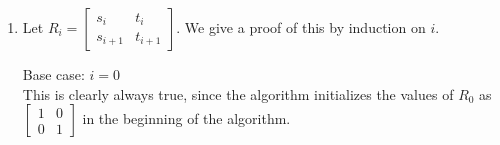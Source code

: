 \documentclass[11pt,a4paper]{article}
\begin{document}
\begin{enumerate}
\begin{enumerate}
\begin{align*}
\begin{bmatrix}
			                                                                        \end{bmatrix}
			            \intertext{The Extended Euclidean algorithm defines $r_{i + 2}$ as $r_{i} - q_{i + 1}r_{i + 1}$. Thus:}
			            R_{i + 1}\begin{bmatrix}
				                     f                  \\ g                   \end{bmatrix} & = \begin{bmatrix}
				                                                                                 r_{i + 1} \\ r_{i + 2}
			                                                                                 \end{bmatrix}
		            \end{align*}
		            As the next step $k = i + 1$ holds, then the general case $i$ must hold as well.

		            \newpage

		      \item Let $R_i = \begin{bmatrix}
				            s_i & t_i \\ s_{i + 1} & t_{i + 1}
			            \end{bmatrix}$. We give a proof of this by induction on $i$.

		            Base case: $i = 0$ \\
		            This is clearly always true, since the algorithm initializes the values of $R_0$ as $\begin{bmatrix}
				            1 & 0 \\ 0 & 1
			            \end{bmatrix}$ in the beginning of the algorithm.


\end{enumerate}
\end{enumerate}
\end{document}

